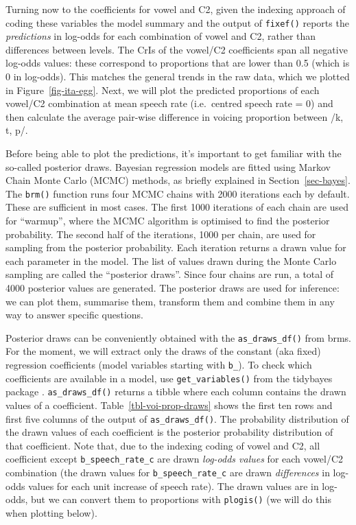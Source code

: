 \documentclass[
  authoryear,
  preprint,
  3p]{elsarticle}
\begin{document}
Turning now to the coefficients for vowel and C2, given the indexing
approach of coding these variables the model summary and the output of
\texttt{fixef()} reports the \emph{predictions} in log-odds for each
combination of vowel and C2, rather than differences between levels. The
CrIs of the vowel/C2 coefficients span all negative log-odds values:
these correspond to proportions that are lower than 0.5 (which is 0 in
log-odds). This matches the general trends in the raw data, which we
plotted in Figure~\ref{fig-ita-egg}. Next, we will plot the predicted
proportions of each vowel/C2 combination at mean speech rate
(i.e.~centred speech rate = 0) and then calculate the average pair-wise
difference in voicing proportion between /k, t, p/.

Before being able to plot the predictions, it's important to get
familiar with the so-called posterior draws. Bayesian regression models
are fitted using Markov Chain Monte Carlo (MCMC) methods, as briefly
explained in Section~\ref{sec-bayes}. The \texttt{brm()} function runs
four MCMC chains with 2000 iterations each by default. These are
sufficient in most cases. The first 1000 iterations of each chain are
used for ``warmup'', where the MCMC algorithm is optimised to find the
posterior probability. The second half of the iterations, 1000 per
chain, are used for sampling from the posterior probability. Each
iteration returns a drawn value for each parameter in the model. The
list of values drawn during the Monte Carlo sampling are called the
``posterior draws''. Since four chains are run, a total of 4000
posterior values are generated. The posterior draws are used for
inference: we can plot them, summarise them, transform them and combine
them in any way to answer specific questions.

Posterior draws can be conveniently obtained with the
\texttt{as\_draws\_df()} from brms. For the moment, we will extract only
the draws of the constant (aka fixed) regression coefficients (model
variables starting with \texttt{b\_}). To check which coefficients are
available in a model, use \texttt{get\_variables()} from the tidybayes
package \citep{kay2019}. \texttt{as\_draws\_df()} returns a tibble where
each column contains the drawn values of a coefficient.
Table~\ref{tbl-voi-prop-draws} shows the first ten rows and first five
columns of the output of \texttt{as\_draws\_df()}. The probability
distribution of the drawn values of each coefficient is the posterior
probability distribution of that coefficient. Note that, due to the
indexing coding of vowel and C2, all coefficient except
\texttt{b\_speech\_rate\_c} are drawn \emph{log-odds values} for each
vowel/C2 combination (the drawn values for \texttt{b\_speech\_rate\_c}
are drawn \emph{differences} in log-odds values for each unit increase
of speech rate). The drawn values are in log-odds, but we can convert
them to proportions with \texttt{plogis()} (we will do this when
plotting below).
\end{document}
